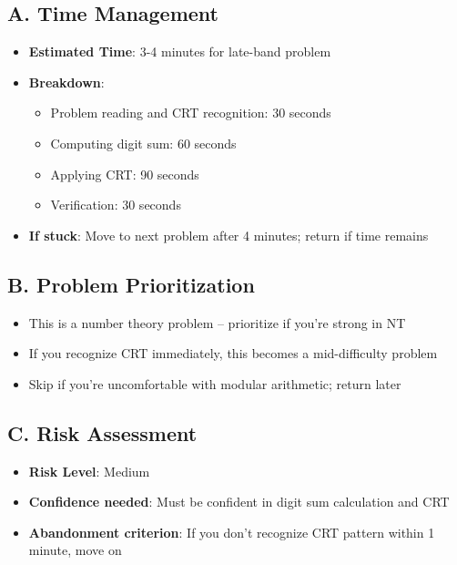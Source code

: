 \documentclass[11pt]{article}
\begin{document}
\begin{competitionbox}
\subsection*{A. Time Management}
\begin{itemize}[leftmargin=*]
    \item \textbf{Estimated Time}: 3-4 minutes for late-band problem
    \item \textbf{Breakdown}:
    \begin{itemize}
        \item Problem reading and CRT recognition: 30 seconds
        \item Computing digit sum: 60 seconds
        \item Applying CRT: 90 seconds
        \item Verification: 30 seconds
    \end{itemize}
    \item \textbf{If stuck}: Move to next problem after 4 minutes; return if time remains
\end{itemize}

\subsection*{B. Problem Prioritization}
\begin{itemize}[leftmargin=*]
    \item This is a number theory problem -- prioritize if you're strong in NT
    \item If you recognize CRT immediately, this becomes a mid-difficulty problem
    \item Skip if you're uncomfortable with modular arithmetic; return later
\end{itemize}

\subsection*{C. Risk Assessment}
\begin{itemize}[leftmargin=*]
    \item \textbf{Risk Level}: Medium
    \item \textbf{Confidence needed}: Must be confident in digit sum calculation and CRT
    \item \textbf{Abandonment criterion}: If you don't recognize CRT pattern within 1 minute, move on
\end{itemize}


\end{competitionbox}
\end{document}
